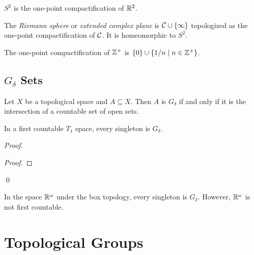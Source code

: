 \begin{example}
    $S^2$ is the one-point compactification of $\mathbb{R}^2$.
\end{example}

\begin{definition}
    The \emph{Riemann sphere} or \emph{extended complex plane} is $\mathcal{C} \cup \{ \infty \}$
    topologized as the one-point compactification of $\mathcal{C}$. It is homeomorphic to $S^2$.
\end{definition}

\begin{example}
    The one-point compactification of $\mathbb{Z}^+$ is $\{0\} \cup \{ 1/n \mid n \in \mathbb{Z}^+ \}$.
\end{example}

\section{$G_\delta$ Sets}

\begin{definition}
    Let $X$ be a topological space and $A \subseteq X$. Then $A$ is \emph{$G_\delta$}
    if and only if it is the intersection of a countable set of open sets.
\end{definition}

\begin{proposition}
    In a first countable $T_1$ space, every singleton is $G_\delta$.
\end{proposition}

\begin{proof}
    \pf
    \begin{proof}
    \end{proof}
    \qed
\end{proof}

\begin{example}
    In the space $\mathbb{R}^\omega$ under the box topology, every singleton is $G_\delta$.
    However, $\mathbb{R}^\omega$ is not first countable.
\end{example}

\chapter{Topological Groups}

